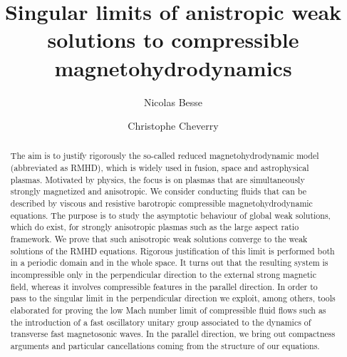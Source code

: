 \documentclass[11pt,reqno]{amsart}
\title%
      {Singular limits of anistropic weak solutions to compressible magnetohydrodynamics
      }
\author[N. Besse]{Nicolas Besse}
\author[C. Cheverry]{Christophe Cheverry}
\begin{document}
\maketitle


\renewcommand{\thefootnote}{\fnsymbol{footnote}}
\renewcommand{\thefootnote}{\arabic{footnote}}

\begin{abstract}
The aim is to justify rigorously the so-called reduced magnetohydrodynamic model (abbreviated as RMHD), which is widely used in fusion, space and astrophysical plasmas. Motivated by physics, the focus is on plasmas that are simultaneously strongly magnetized and anisotropic. We consider conducting fluids that can be described by viscous and resistive barotropic compressible magnetohydrodynamic equations. The purpose is to study the asymptotic behaviour of global weak solutions, which do exist, for strongly anisotropic plasmas such as the large aspect ratio framework. We prove that such anisotropic weak solutions converge to the weak solutions of the RMHD equations. Rigorous justification of this limit is performed both in a periodic domain and in the whole space. It turns out that the resulting  system is incompressible only in the perpendicular direction to the external strong magnetic field, whereas it involves compressible features in the parallel direction. In order to pass to the singular limit in the perpendicular direction we exploit, among others,  tools elaborated for proving the low Mach number limit of compressible fluid flows such as the introduction of a fast oscillatory unitary group associated to the dynamics of  transverse fast magnetosonic waves. In the parallel direction, we bring out compactness arguments and  particular cancellations coming from the structure of our  equations.
\end{abstract}


{\small \parskip=1pt
\setcounter{tocdepth}{1}
\tableofcontents
}
\end{document}
